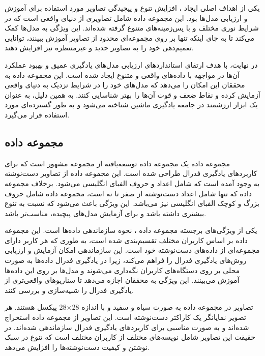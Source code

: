 یکی از اهداف اصلی ایجاد
،
افزایش تنوع و پیچیدگی تصاویر مورد استفاده برای آموزش و ارزیابی مدل‌ها بود. این مجموعه داده شامل تصاویری از دنیای واقعی است که در شرایط نوری مختلف و با پس‌زمینه‌های متنوع گرفته شده‌اند. این ویژگی به مدل‌ها کمک می‌کند تا به جای اینکه تنها بر روی مجموعه‌ای محدود از تصاویر آموزش ببینند، توانایی تعمیم‌دهی خود را به تصاویر جدید و غیرمنتظره نیز افزایش دهند.

در نهایت،
با هدف ارتقای استانداردهای ارزیابی مدل‌های یادگیری عمیق و بهبود عملکرد آن‌ها در مواجهه با داده‌های واقعی و متنوع ایجاد شده است. این مجموعه داده به محققان این امکان را می‌دهد که مدل‌های خود را در شرایط نزدیک به دنیای واقعی آزمایش کرده و نقاط ضعف و قوت آن‌ها را بهتر شناسایی کنند. به همین دلیل،
به عنوان یک ابزار ارزشمند در جامعه یادگیری ماشین شناخته می‌شود و به طور گسترده‌ای مورد استفاده قرار می‌گیرد.


\subsection{
	مجموعه داده
}
مجموعه داده
یک مجموعه داده توسعه‌یافته از مجموعه مشهور
است که برای کاربردهای یادگیری فدرال طراحی شده است. این مجموعه داده از تصاویر دست‌نوشته به وجود آمده است که شامل اعداد و حروف الفبای انگلیسی می‌شود. برخلاف مجموعه داده
که تنها شامل اعداد دست‌نوشته از صفر تا نه است، مجموعه داده
شامل حروف بزرگ و کوچک الفبای انگلیسی نیز می‌باشد. این ویژگی باعث می‌شود که
نسبت به
تنوع بیشتری داشته باشد و برای آزمایش مدل‌های پیچیده‌، مناسب‌تر باشد.

یکی از ویژگی‌های برجسته مجموعه داده
،
نحوه سازماندهی داده‌ها است. این مجموعه داده بر اساس کاربران مختلف تقسیم‌بندی شده است، به طوری که هر کاربر دارای مجموعه‌ای از داده‌های دست‌نوشته خود است. این سازماندهی امکان آزمایش و ارزیابی روش‌های یادگیری فدرال را فراهم می‌کند، زیرا در یادگیری فدرال داده‌ها به صورت محلی بر روی دستگاه‌های کاربران نگه‌داری می‌شوند و مدل‌ها بر روی این داده‌ها آموزش می‌بینند. این ویژگی به محققان اجازه می‌دهد تا سناریوهای واقعی‌تری از یادگیری فدرال را شبیه‌سازی و بررسی کنند.

تصاویر در مجموعه داده
به صورت سیاه و سفید و با اندازه
28$\times$28
پیکسل هستند. هر تصویر نمایانگر یک کاراکتر دست‌نوشته است. این تصاویر از مجموعه داده
استخراج شده‌اند و به صورت مناسبی برای کاربردهای یادگیری فدرال سازماندهی شده‌اند. در حقیقت این تصاویر شامل نویسه‌های مختلف از کاربران مختلف است که تنوع در سبک نوشتن و کیفیت دست‌نوشته‌ها را افزایش می‌دهد.

